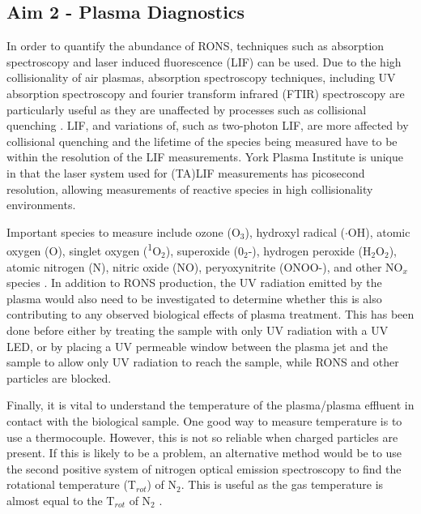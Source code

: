 \documentclass[11pt, oneside]{article}   	%
\begin{document}
\subsection*{Aim 2 - Plasma Diagnostics}
In order to quantify the abundance of RONS, techniques such as absorption spectroscopy and laser induced fluorescence (LIF) can be used. 
Due to the high collisionality of air plasmas, absorption spectroscopy techniques, including UV absorption spectroscopy and fourier transform infrared (FTIR) spectroscopy are particularly useful as they are unaffected by processes such as collisional quenching \cite{Niemi2013absolute, Schroter2015atomic}.
LIF, and variations of, such as two-photon LIF, are more affected by collisional quenching and the lifetime of the species being measured have to be within the resolution of the LIF measurements.
York Plasma Institute is unique in that the laser system used for (TA)LIF measurements has picosecond resolution, allowing measurements of reactive species in high collisionality environments.

Important species to measure include ozone (O$_3$),  hydroxyl radical ($\cdot$OH), atomic oxygen (O), singlet oxygen (\textsuperscript{1}O$_2$), superoxide (0$_2$-), hydrogen peroxide (H$_2$O$_2$),  atomic nitrogen (N), nitric oxide (NO), peryoxynitrite (ONOO-), and other NO$_x$ species \cite{Graves2014low}. 
In addition to RONS production, the UV radiation emitted by the plasma would also need to be investigated to determine whether this is also contributing to any observed biological effects of plasma treatment. This has been done before either by treating the sample with only UV radiation with a UV LED, or by placing a UV permeable window between the plasma jet and the sample to allow only UV radiation to reach the sample, while RONS and other particles are blocked.

Finally, it is vital to understand the temperature of the plasma/plasma effluent in contact with the biological sample.
One good way to measure temperature is to use a thermocouple. However, this is not so reliable when charged particles are present. If this is likely to be a problem, an alternative method would be to use the second positive system of nitrogen optical emission spectroscopy to find the rotational temperature (T$_{rot}$) of N$_2$. This is useful as the gas temperature is almost equal to the T$_{rot}$ of N$_2$ \cite{Twomey2011correlation}.
\end{document}

